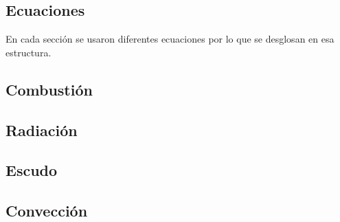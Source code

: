 \subsection{Ecuaciones}

\par En cada sección se usaron diferentes ecuaciones por lo que se desglosan en esa estructura.

\subsection{Combustión}
\subsection{Radiación}
\subsection{Escudo}
\subsection{Convección}